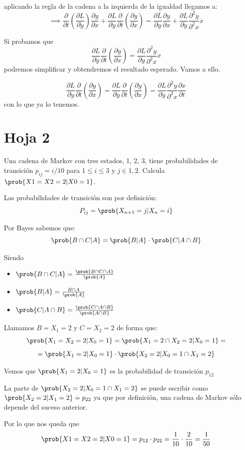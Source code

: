 \begin{problem}[15]
aplicando la regla de la cadena a la izquierda de la igualdad llegamos a:
\[\implies \frac{\partial}{\partial t} \left( \frac{\partial L}{\partial \dot y}\right)\frac{\partial y}{\partial x} + \frac{\partial L}{\partial \dot y}\frac{\partial}{\partial t} \left( \frac{\partial y}{\partial x}\right) = \frac{\partial \bar{L}}{\partial y}\frac{\partial y}{\partial x}+\frac{\partial L}{\partial \dot y}\frac{\partial^2 y}{\partial^2 x}\dot x\]

Si probamos que
\[\frac{\partial L}{\partial \dot y}\frac{\partial}{\partial t} \left( \frac{\partial y}{\partial x}\right) = \frac{\partial L}{\partial \dot y}\frac{\partial^2 y}{\partial^2 x}\dot x\]
podremos simplificar y obtendremos el resultado esperado. Vamos a ello.

\[\frac{\partial L}{\partial \dot y}\frac{\partial}{\partial t} \left( \frac{\partial y}{\partial x}\right) = \frac{\partial L}{\partial \dot y}\frac{\partial}{\partial t} \left( \frac{\partial y}{\partial x}\right) = \frac{\partial L}{\partial \dot y}\frac{\partial^2 y}{\partial^2 x}\frac{\partial x}{\partial t}\]
con lo que ya lo tenemos.

\end{problem}

\section{Hoja 2}

\begin{problem}[1]
	Una cadena de Markov con tres estados, {1, 2, 3}, tiene probabilidades de transición
	$p_{ij} = i/10$ para $1 ≤ i ≤ 3$ y $j ∈ {1, 2}$. Calcula $\prob{X1 = X2 = 2|X0 = 1}$.

	\solution
	Las probabilidades de transición son por definición:
	$$P_{ij} = \prob{X_{n+1} = j | X_n = i}$$

	Por Bayes sabemos que:
	$$\prob{B\cap C|A} = \prob{B|A} \cdot \prob{C|A\cap B}$$

	Siendo
	\begin{itemize}
		\item 	$\prob{B\cap C|A} = \frac{\prob{B\cap C \cap A}}{\prob{A}}$
		\item  $ \prob{B|A} = \frac{B\cap A}{\prob{A}}$
		\item  $\prob{C|A\cap B}= \frac{\prob{C\cap A \cap B}}{\prob{A\cap B}}$
	\end{itemize}

	Llamamos $B={X_1 = 2}$ y $C={X_2 = 2}$ de forma que:
	\[\prob{X_1 = X_2 = 2|X_0 = 1} = \prob{X_1 = 2 \cap X_2 = 2|X_0 = 1} =\]
	\[= \prob{X_1=2|X_0=1} \cdot \prob{X_2 =2 |X_0 = 1 \cap X_1 =2}\]

	Vemos que $\prob{X_1=2|X_0=1}$ es la probabilidad de transición $p_{12}$

	La parte de $\prob{X_2 =2 |X_0 = 1 \cap X_1 =2}$ se puede escribir como $\prob{X_2 =2 | X_1 =2} = p_{22}$ ya que por definición, una cadena de Markov sólo depende del suceso anterior.

	Por lo que nos queda que
	$$\prob{X1 = X2 = 2|X0 = 1} = p_{12} \cdot p_{22} = \frac{1}{10} \cdot \frac{2}{10} = \frac{1}{50}$$
\end{problem}




